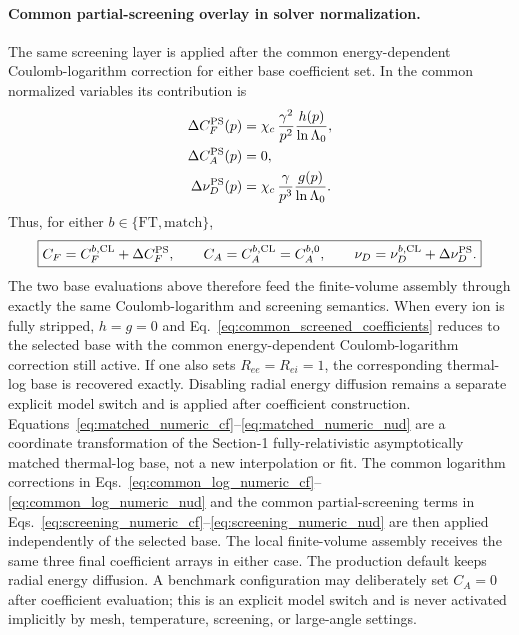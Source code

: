 \documentclass[11pt]{article}
\begin{document}
\paragraph{Common partial-screening overlay in solver normalization.}
The same screening layer is applied after the common energy-dependent Coulomb-logarithm
correction for either base coefficient set.  In the common normalized variables its
contribution is
\begin{align}
 \Delta C_F^{\rm PS}(p)
 &=\chi_c\,\frac{\gamma^2}{p^2}\frac{h(p)}{\ln\Lambda_0},
 \label{eq:screening_numeric_cf}\\
 \Delta C_A^{\rm PS}(p)&=0,
 \label{eq:screening_numeric_ca}\\
 \Delta\nu_D^{\rm PS}(p)
 &=\chi_c\,\frac{\gamma}{p^3}\frac{g(p)}{\ln\Lambda_0}.
 \label{eq:screening_numeric_nud}
\end{align}
Thus, for either $b\in\{\mathrm{FT},\mathrm{match}\}$,
\begin{equation}
 \boxed{
 C_F=C_F^{b,\rm CL}+\Delta C_F^{\rm PS},\qquad
 C_A=C_A^{b,\rm CL}=C_A^{b,0},\qquad
 \nu_D=\nu_D^{b,\rm CL}+\Delta\nu_D^{\rm PS}.
 }
 \label{eq:common_screened_coefficients}
\end{equation}
The two base evaluations above therefore feed the finite-volume assembly through exactly
the same Coulomb-logarithm and screening semantics.  When every ion is fully stripped,
$h=g=0$ and Eq.~\eqref{eq:common_screened_coefficients} reduces to the selected base with
the common energy-dependent Coulomb-logarithm correction still active.  If one also sets
$R_{ee}=R_{ei}=1$, the corresponding thermal-log base is recovered exactly.  Disabling
radial energy diffusion remains a separate explicit model switch and is applied after
coefficient construction.
Equations~\eqref{eq:matched_numeric_cf}--\eqref{eq:matched_numeric_nud} are a coordinate
transformation of the Section-1 fully-relativistic asymptotically matched thermal-log base,
not a new interpolation or fit.  The common logarithm corrections in
Eqs.~\eqref{eq:common_log_numeric_cf}--\eqref{eq:common_log_numeric_nud} and the common
partial-screening terms in Eqs.~\eqref{eq:screening_numeric_cf}--\eqref{eq:screening_numeric_nud}
are then applied independently of the selected base.  The local finite-volume assembly
receives the same three final coefficient arrays in either case.  The production default
keeps radial energy diffusion.  A benchmark configuration may deliberately set $C_A=0$
after coefficient evaluation; this is an explicit model switch and is never activated
implicitly by mesh, temperature, screening, or large-angle settings.
\end{document}

